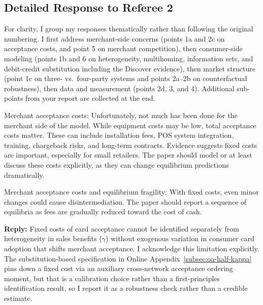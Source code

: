 \documentclass[main.tex]{subfiles}
\begin{document}
\begin{refsection}


\section*{Detailed Response to Referee 2}

For clarity, I group my responses thematically rather than following the original numbering.
I first address merchant-side concerns (points 1a and 2c on acceptance costs, and point 5 on merchant competition), then consumer-side modeling (points 1b and 6 on heterogeneity, multihoming, information sets, and debit-credit substitution including the Discover evidence), then market structure (point 1c on three- vs.\ four-party systems and points 2a--2b on counterfactual robustness), then data and measurement (points 2d, 3, and 4).
Additional sub-points from your report are collected at the end.

\begin{refcommentnoclear}
Merchant acceptance costs: Unfortunately, not much has been done for the merchant side of the model.
While equipment costs may be low, total acceptance costs matter.
These can include installation fees, POS system integration, training, chargeback risks, and long-term contracts.
Evidence suggests fixed costs are important, especially for small retailers.
The paper should model or at least discuss these costs explicitly, as they can change equilibrium predictions dramatically.
\end{refcommentnoclear}

\begin{refcommentnoclear}
Merchant acceptance costs and equilibrium fragility: With fixed costs, even minor changes could cause disintermediation.
The paper should report a sequence of equilibria as fees are gradually reduced toward the cost of cash.
\end{refcommentnoclear}

\textbf{Reply:} Fixed costs of card acceptance cannot be identified separately from heterogeneity in sales benefits ($\gamma$) without exogenous variation in consumer card adoption that shifts merchant acceptance.
I acknowledge this limitation explicitly.
The substitution-based specification in Online Appendix~\ref{subsec:oa-half-kappa} pins down a fixed cost via an auxiliary cross-network acceptance ordering moment, but that is a calibration choice rather than a first-principles identification result, so I report it as a robustness check rather than a credible estimate.


\end{refsection}
\end{document}
